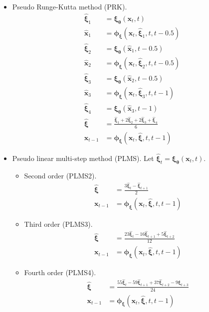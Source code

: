 \documentclass[10pt]{article}
\newcommand{\ve}[1]{\mathbf{#1}}
\newcommand{\ves}[1]{\boldsymbol{#1}}
\begin{document}
\begin{itemize}
\begin{itemize}
    \item Pseudo Runge-Kutta method (PRK).
    \begin{align*}
      \widehat{\ves{\xi}}_1 &= \ves{\xi}_{\ves{\theta}}(\ve{x}_t, t) \\
      \widehat{\ve{x}}_1 &= \ves{\phi}_{\ves{\xi}}(\ve{x}_t, \widehat{\ves{\xi}}_1, t, t-0.5) \\
      \widehat{\ves{\xi}}_2 &= \ves{\xi}_{\ves{\theta}}(\widehat{\ve{x}}_1, t - 0.5) \\
      \widehat{\ve{x}}_2 &= \ves{\phi}_{\ves{\xi}}(\ve{x}_t, \widehat{\ves{\xi}}_2, t, t-0.5) \\
      \widehat{\ves{\xi}}_3 &= \ves{\xi}_{\ves{\theta}}(\widehat{\ve{x}}_2, t-0.5) \\
      \widehat{\ve{x}}_3 &= \ves{\phi}_{\ves{\xi}}(\ve{x}_t, \widehat{\ves{\xi}}_3, t, t-1) \\      
      \widehat{\ves{\xi}}_4 &= \ves{\xi}_{\ves{\theta}}(\widehat{\ve{x}}_3, t-1) \\
      \widehat{\ves{\xi}} &= \frac{\widehat{\ves{\xi}}_1  + 2 \widehat{\ves{\xi}}_2 + 2 \widehat{\ves{\xi}}_3 + \widehat{\ves{\xi}}_4}{6} \\
      \ve{x}_{t-1} &= \ves{\phi}_{\ves{\xi}}(\ve{x}_t, \widehat{\ves{\xi}}, t, t-1) 
    \end{align*}

    \item Pseudo linear multi-step method (PLMS). Let $\widehat{\ves{\xi}}_t = \ves{\xi}_{\ves{\theta}}(\ve{x}_t, t)$.
    \begin{itemize}
      \item Second order (PLMS2).
      \begin{align*}
        \widehat{\ves{\xi}} &= \frac{3 \widehat{\ves{\xi}}_{t} - \widehat{\ves{\xi}}_{t+1}}{2} \\
        \ve{x}_{t-1} &= \ves{\phi}_{\ves{\xi}}(\ve{x}_t, \widehat{\ves{\xi}}, t, t-1) 
      \end{align*}
      \item Third order (PLMS3).
      \begin{align*}
        \widehat{\ves{\xi}} &= \frac{23 \widehat{\ves{\xi}}_{t} - 16\widehat{\ves{\xi}}_{t+1} + 5\widehat{\ves{\xi}}_{t+2}}{12} \\
        \ve{x}_{t-1} &= \ves{\phi}_{\ves{\xi}}(\ve{x}_t, \widehat{\ves{\xi}}, t, t-1) 
      \end{align*}
      \item Fourth order (PLMS4).
      \begin{align*}
        \widehat{\ves{\xi}} &= \frac{55 \widehat{\ves{\xi}}_{t} - 59\widehat{\ves{\xi}}_{t+1} + 37\widehat{\ves{\xi}}_{t+2} - 9 \widehat{\ves{\xi}}_{t+3}}{24} \\
        \ve{x}_{t-1} &= \ves{\phi}_{\ves{\xi}}(\ve{x}_t, \widehat{\ves{\xi}}, t, t-1) 
      \end{align*}
    \end{itemize}
  \end{itemize}
\end{itemize}
\end{document}
